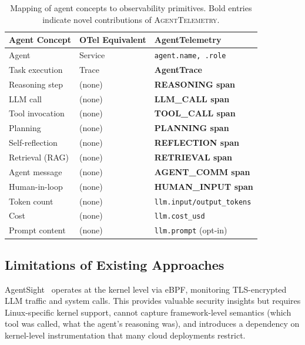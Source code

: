 \documentclass[sigconf,nonacm]{acmart}
\begin{document}
\begin{table}[t]
\centering
\small
\caption{Mapping of agent concepts to observability primitives.  Bold entries indicate novel contributions of \textsc{AgentTelemetry}.}
\label{tab:gap}
\begin{tabular}{@{}lll@{}}
\toprule
\textbf{Agent Concept} & \textbf{OTel Equivalent} & \textbf{AgentTelemetry} \\
\midrule
Agent            & Service         & \texttt{agent.name, .role} \\
Task execution   & Trace           & \textbf{AgentTrace} \\
Reasoning step   & (none)          & \textbf{REASONING span} \\
LLM call         & (none)          & \textbf{LLM\_CALL span} \\
Tool invocation  & (none)          & \textbf{TOOL\_CALL span} \\
Planning         & (none)          & \textbf{PLANNING span} \\
Self-reflection  & (none)          & \textbf{REFLECTION span} \\
Retrieval (RAG)  & (none)          & \textbf{RETRIEVAL span} \\
Agent message    & (none)          & \textbf{AGENT\_COMM span} \\
Human-in-loop    & (none)          & \textbf{HUMAN\_INPUT span} \\
Token count      & (none)          & \texttt{llm.input/output\_tokens} \\
Cost             & (none)          & \texttt{llm.cost\_usd} \\
Prompt content   & (none)          & \texttt{llm.prompt} (opt-in) \\
\bottomrule
\end{tabular}
\end{table}

\subsection{Limitations of Existing Approaches}
AgentSight~\cite{agentsight} operates at the kernel level via eBPF,
monitoring TLS-encrypted LLM traffic and system calls.  This provides
valuable security insights but requires Linux-specific kernel support,
cannot capture framework-level semantics (which tool was called, what
the agent's reasoning was), and introduces a dependency on
kernel-level instrumentation that many cloud deployments restrict.
\end{document}
